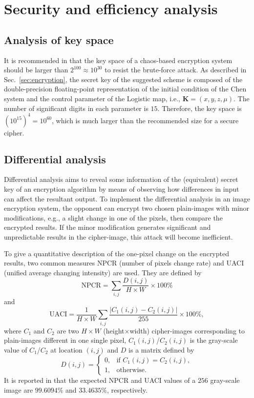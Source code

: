 \documentclass[3p,preprint,11pt]{elsarticle}
\begin{document}
\section{Security and efficiency analysis}
\label{sec:securityanalysis}
\subsection{Analysis of key space}
It is recommended in \cite{shujun:BasicRrequirement:IJBC06} that the key space of a chaos-based encryption system
should be larger than $2^{100} \approx 10^{30}$ to resist the brute-force attack.
As described in Sec.~\ref{sec:encryption}, the secret key
of the suggested scheme is composed of the double-precision floating-point representation of the initial condition of the Chen
system and the control parameter of the Logistic map, i.e., $\bm{K} = (x, y, z, \mu)$.
The number of significant digits in each parameter is $15$.
Therefore, the key space is $(10^{15})^4 = 10^{60}$, which is much larger
than the recommended size for a secure cipher.

\subsection{Differential analysis}
Differential analysis aims to reveal some information of the (equivalent) secret key of an encryption
algorithm by means of observing how differences in input can affect the resultant output.
To implement the differential
analysis in an image encryption system, the opponent can encrypt two chosen plain-images
with minor modifications, e.g., a slight change in one of the pixels, then compare the encrypted results.
If the minor modification generates significant and unpredictable results in the cipher-image,
this attack will become inefficient.

To give a quantitative description of the one-pixel change on the encrypted results, two common measures
NPCR (number of pixels change rate) and UACI (unified average changing intensity) are used. They are defined
by
\begin{equation*}
\text{NPCR} = \sum_{i,j} \frac{D(i,j)} {H \times W} \times 100\%
\end{equation*}
and
\begin{equation*}
\text{UACI} = \frac{1}{H \times W} \sum_{i,j} \frac{\left| C_1(i,j) - C_2(i,j) \right|}{255}\times 100\%,
\end{equation*}
where $C_1$ and $C_2$ are two $H\times W$ (height$\times$width) cipher-images corresponding to
plain-images different in one single pixel, $C_1(i,j)$/$C_2(i,j)$ is the gray-scale value of $C_1$/$C_2$
at location $(i,j)$ and $D$ is a matrix defined by
\begin{equation*}
            D(i,j) =
            \begin{cases}
            0,     & \text{if } C_1(i,j)=C_2(i,j),\\
            1, & \text{otherwise}.
            \end{cases}
\end{equation*}
It is reported in \cite{Zhu:HyperEnc:OC12} that the expected NPCR and UACI values of a $256$
gray-scale image are $99.6094\%$ and $33.4635\%$, respectively.
\end{document}
